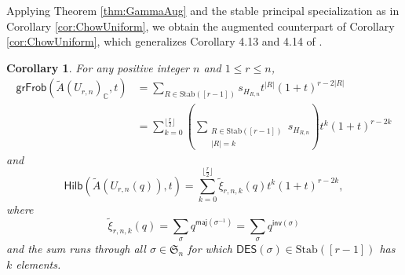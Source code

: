 \documentclass[reqno]{amsart}
\newcommand{\DES}{{\mathsf{DES}}}
\newcommand{\inv}{{\mathsf{inv}}}
\newcommand{\maj}{{\mathsf{maj}}}
\newcommand{\Stab}{{\mathrm{Stab}}}
\renewcommand{\S}{{\mathfrak{S}}}
\newcommand{\Hilb}{{\mathsf{Hilb}}}
\newcommand{\grFrob}{{\mathsf{grFrob}}}
\newtheorem{cor}[thm]{Corollary}
\theoremstyle{definition}
\theoremstyle{remark}
\begin{document}
Applying Theorem \ref{thm:GammaAug} and the stable principal specialization as in Corollary \ref{cor:ChowUniform}, we obtain the augmented counterpart of Corollary \ref{cor:ChowUniform}, which generalizes Corollary 4.13 and 4.14 of \cite{Liao2023Two}.

\begin{cor} \label{cor:AugUniform}
For any positive integer $n$ and $1\le r\le n$,
\begin{align*}
    \grFrob(\widetilde{A}(U_{r,n})_{\mathbb{C}},t)
    &=\sum_{R\in\Stab([r-1])}s_{H_{R,n}}t^{|R|}(1+t)^{r-2|R|}\\
    &=\sum_{k=0}^{\lfloor\frac{r}{2}\rfloor}\left(\sum_{\substack{R\in\Stab([r-1])\\ |R|=k}}s_{H_{R,n}}\right)t^k(1+t)^{r-2k}
\end{align*}
and 
\[
    \Hilb(\widetilde{A}(U_{r,n}(q)),t)=\sum_{k=0}^{\lfloor\frac{r}{2}\rfloor}\widetilde{\xi}_{r,n,k}(q)t^k(1+t)^{r-2k},
\]
where 
\[
    \widetilde{\xi}_{r,n,k}(q)=\sum_{\sigma}q^{\maj(\sigma^{-1})}=\sum_{\sigma}q^{\inv(\sigma)}
\]
and the sum runs through all $\sigma\in\S_n$ for which $\DES(\sigma)\in\Stab([r-1])$ has $k$ elements.
\end{cor}
\end{document}
